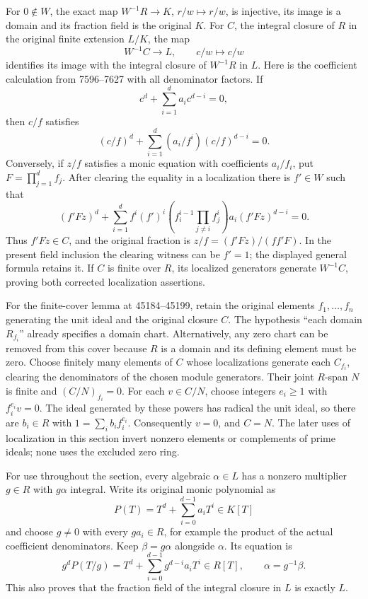 For \(0\notin W\), the exact map \(W^{-1}R\to K\), \(r/w\mapsto r/w\), is injective, its image is a domain and its fraction field is the original \(K\). For \(C\), the integral closure of \(R\) in the original finite extension \(L/K\), the map \[
 W^{-1}C\longrightarrow L,\qquad c/w\longmapsto c/w
\] identifies its image with the integral closure of \(W^{-1}R\) in \(L\). Here is the coefficient calculation from 7596--7627 with all denominator factors. If \[
 c^d+\sum_{i=1}^{d}a_i c^{d-i}=0,
\] then \(c/f\) satisfies \[
 (c/f)^d+\sum_{i=1}^{d}(a_i/f^i)(c/f)^{d-i}=0.
\] Conversely, if \(z/f\) satisfies a monic equation with coefficients \(a_i/f_i\), put \(F=\prod_{j=1}^{d}f_j\). After clearing the equality in a localization there is \(f'\in W\) such that \[
 (f'Fz)^d+
 \sum_{i=1}^{d}
 f^i(f')^i\left(f_i^{i-1}\prod_{j\ne i}f_j^i\right)a_i
 (f'Fz)^{d-i}=0.
\] Thus \(f'Fz\in C\), and the original fraction is \(z/f=(f'Fz)/(ff'F)\). In the present field inclusion the clearing witness can be \(f'=1\); the displayed general formula retains it. If \(C\) is finite over \(R\), its localized generators generate \(W^{-1}C\), proving both corrected localization assertions.

For the finite-cover lemma at 45184--45199, retain the original elements \(f_1,\ldots,f_n\) generating the unit ideal and the original closure \(C\). The hypothesis ``each domain \(R_{f_i}\)'' already specifies a domain chart. Alternatively, any zero chart can be removed from this cover because \(R\) is a domain and its defining element must be zero. Choose finitely many elements of \(C\) whose localizations generate each \(C_{f_i}\), clearing the denominators of the chosen module generators. Their joint \(R\)-span \(N\) is finite and \((C/N)_{f_i}=0\). For each \(v\in C/N\), choose integers \(e_i\geq1\) with \(f_i^{e_i}v=0\). The ideal generated by these powers has radical the unit ideal, so there are \(b_i\in R\) with \(1=\sum_i b_i f_i^{e_i}\). Consequently \(v=0\), and \(C=N\). The later uses of localization in this section invert nonzero elements or complements of prime ideals; none uses the excluded zero ring.

For use throughout the section, every algebraic \(\alpha\in L\) has a nonzero multiplier \(g\in R\) with \(g\alpha\) integral. Write its original monic polynomial as \[
 P(T)=T^d+\sum_{i=0}^{d-1}a_iT^i\in K[T]
\] and choose \(g\ne0\) with every \(ga_i\in R\), for example the product of the actual coefficient denominators. Keep \(\beta=g\alpha\) alongside \(\alpha\). Its equation is \[
 g^dP(T/g)=T^d+\sum_{i=0}^{d-1}g^{d-i}a_iT^i\in R[T],
 \qquad \alpha=g^{-1}\beta.
\] This also proves that the fraction field of the integral closure in \(L\) is exactly \(L\).

